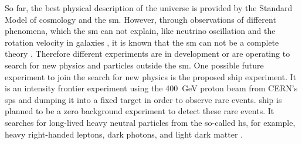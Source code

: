 So far, the best physical description of the universe is provided by the Standard Model of cosmology and the \ac{sm}.
However, through observations of different phenomena, which the \ac{sm} can not explain, like neutrino oscillation \cite{} and the rotation velocity in galaxies \cite{}, it is known that the \ac{sm} can not be a complete theory \cite{}.
Therefore different experiments are in development or are operating to search for new physics and particles outside the \ac{sm}.
One possible future experiment to join the search for new physics is the proposed \ac{ship} experiment.
It is an intensity frontier experiment using the \SI{400}{\giga\electronvolt} proton beam from CERN's \ac{sps} and dumping it into a fixed target in order to observe rare events.
\ac{ship} is planned to be a zero background experiment to detect these rare events.
It searches for long-lived heavy neutral particles from the so-called \ac{hs}, for example, heavy right-handed leptons, dark photons, and light dark matter \cite{}.

